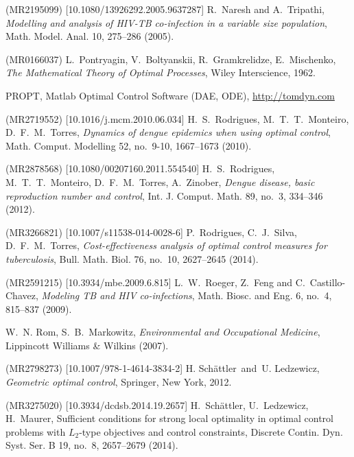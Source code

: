 \documentclass{my_aims}
\theoremstyle{definition}
\begin{document}
\begin{thebibliography}{99}
 (MR2195099) [10.1080/13926292.2005.9637287]
\newblock R.~Naresh and A.~Tripathi,
\newblock \emph{Modelling and analysis of HIV-TB co-infection in a variable size population},
\newblock Math. Model. Anal. 10, 275--286 (2005).

 (MR0166037)
\newblock L.~Pontryagin, V.~Boltyanskii, R.~Gramkrelidze, E.~Mischenko,
\newblock \emph{The Mathematical Theory of Optimal Processes},
\newblock Wiley Interscience, 1962.

\newblock PROPT,
\newblock Matlab Optimal Control Software (DAE, ODE),
\newblock \url{http://tomdyn.com}

 (MR2719552) [10.1016/j.mcm.2010.06.034]
\newblock H.~S.~Rodrigues, M.~T.~T.~Monteiro, D.~F.~M.~Torres,
\newblock \emph{Dynamics of dengue epidemics when using optimal control},
\newblock Math. Comput. Modelling 52, no.~9-10, 1667--1673 (2010).

 (MR2878568) [10.1080/00207160.2011.554540]
\newblock H.~S.~Rodrigues, M.~T.~T.~Monteiro, D.~F.~M.~Torres, A.~Zinober,
\newblock \emph{Dengue disease, basic reproduction number and control},
\newblock Int. J. Comput. Math. 89, no.~3, 334--346 (2012).

 (MR3266821) [10.1007/s11538-014-0028-6]
\newblock P.~Rodrigues, C.~J.~Silva, D.~F.~M.~Torres,
\newblock \emph{Cost-effectiveness analysis of optimal control measures for tuberculosis},
\newblock Bull. Math. Biol. 76, no.~10, 2627--2645 (2014).

 (MR2591215) [10.3934/mbe.2009.6.815]
\newblock L.~W.~Roeger, Z.~Feng and C.~Castillo-Chavez,
\newblock \emph{Modeling TB and HIV co-infections},
\newblock Math. Biosc. and Eng. 6, no.~4, 815--837 (2009).

\newblock W.~N. Rom, S.~B.~Markowitz,
\newblock \emph{Environmental and Occupational Medicine},
\newblock Lippincott Williams \& Wilkins (2007).

 (MR2798273) [10.1007/978-1-4614-3834-2]
\newblock H. Sch\"attler\ and\ U. Ledzewicz,
\newblock \emph{Geometric optimal control},
\newblock Springer, New York, 2012.

 (MR3275020) [10.3934/dcdsb.2014.19.2657]
\newblock H.~Sch\"{a}ttler, U.~Ledzewicz, H.~Maurer,
\newblock Sufficient conditions for strong local optimality
in optimal control problems with $L_2$-type objectives and control constraints,
\newblock Discrete Contin. Dyn. Syst. Ser. B 19, no.~8, 2657--2679 (2014).


\end{thebibliography}
\end{document}
